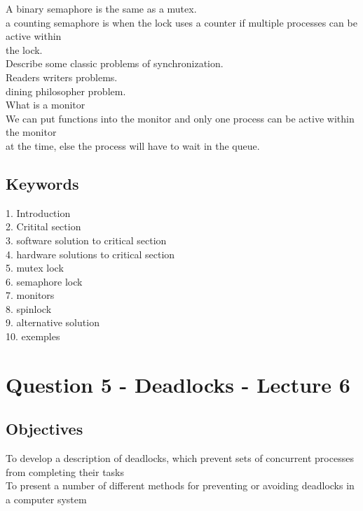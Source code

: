 \documentclass[a4paper,10pt,titlepage]{report}
\begin{document}
\hspace{10mm}  A binary semaphore is the same as a mutex. \\

\hspace{10mm}  a counting semaphore is when the lock uses a counter if multiple processes can be active within \\
\hspace{10mm}  the lock. \\


Describe some classic problems of synchronization. \\

\hspace{10mm}  Readers writers problems.\\
\hspace{10mm} dining philosopher problem. \\


What is a monitor \\
\hspace{10mm}  We can put functions into the monitor and only one process can be active within the monitor \\
\hspace{10mm} at the time, else the process will have to wait in the queue.






\subsection{Keywords}
1. Introduction\\
2. Critital section\\
3. software solution to critical section\\
4. hardware solutions to critical section\\
5. mutex lock\\
6. semaphore lock\\
7. monitors\\
8. spinlock\\
9. alternative solution\\
10. exemples\\

\newpage
\section{Question 5 - Deadlocks - Lecture 6}
\subsection{Objectives}
To develop a description of deadlocks, which prevent sets of concurrent
processes from completing their tasks\\
To present a number of different methods for preventing or avoiding
deadlocks in a computer system\\
\end{document}
